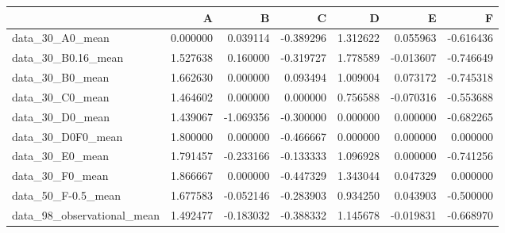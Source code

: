 \begin{tabular}{lrrrrrr}
\toprule
{} &         A &         B &         C &         D &         E &         F \\
\midrule
data\_30\_A0\_mean            &  0.000000 &  0.039114 & -0.389296 &  1.312622 &  0.055963 & -0.616436 \\
data\_30\_B0.16\_mean         &  1.527638 &  0.160000 & -0.319727 &  1.778589 & -0.013607 & -0.746649 \\
data\_30\_B0\_mean            &  1.662630 &  0.000000 &  0.093494 &  1.009004 &  0.073172 & -0.745318 \\
data\_30\_C0\_mean            &  1.464602 &  0.000000 &  0.000000 &  0.756588 & -0.070316 & -0.553688 \\
data\_30\_D0\_mean            &  1.439067 & -1.069356 & -0.300000 &  0.000000 &  0.000000 & -0.682265 \\
data\_30\_D0F0\_mean          &  1.800000 &  0.000000 & -0.466667 &  0.000000 &  0.000000 &  0.000000 \\
data\_30\_E0\_mean            &  1.791457 & -0.233166 & -0.133333 &  1.096928 &  0.000000 & -0.741256 \\
data\_30\_F0\_mean            &  1.866667 &  0.000000 & -0.447329 &  1.343044 &  0.047329 &  0.000000 \\
data\_50\_F-0.5\_mean         &  1.677583 & -0.052146 & -0.283903 &  0.934250 &  0.043903 & -0.500000 \\
data\_98\_observational\_mean &  1.492477 & -0.183032 & -0.388332 &  1.145678 & -0.019831 & -0.668970 \\
\bottomrule
\end{tabular}
